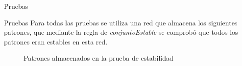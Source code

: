 \documentclass{beamer}
\begin{document}
\begin{frame}{Pruebas}
\begin{block}{Pruebas}
Para todas las pruebas se utiliza una red que almacena los siguientes patrones, que mediante la regla de \emph{conjuntoEstable} se comprobó que todos los patrones eran estables en esta red.
\begin{figure}[h!]
 \centering
 \caption{Patrones almacenados en la prueba de estabilidad}
 \label{Fig:stability}
\end{figure}
\end{block}
\end{frame}
\end{document}
